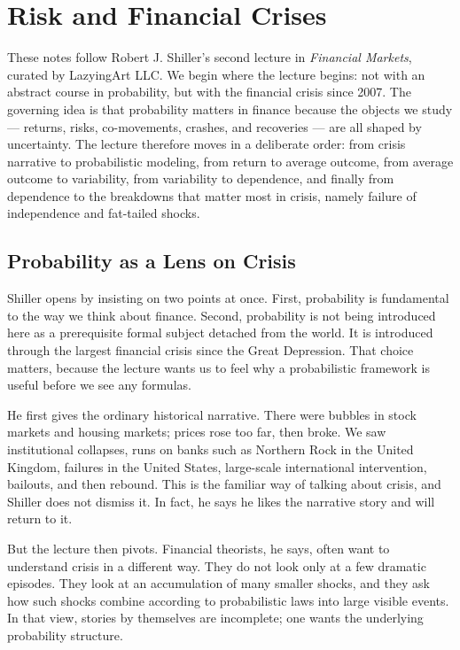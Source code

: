 \chapter{Risk and Financial Crises}

These notes follow Robert J. Shiller's second lecture in \textit{Financial Markets}, curated by LazyingArt LLC. We begin where the lecture begins: not with an abstract course in probability, but with the financial crisis since 2007. The governing idea is that probability matters in finance because the objects we study --- returns, risks, co-movements, crashes, and recoveries --- are all shaped by uncertainty. The lecture therefore moves in a deliberate order: from crisis narrative to probabilistic modeling, from return to average outcome, from average outcome to variability, from variability to dependence, and finally from dependence to the breakdowns that matter most in crisis, namely failure of independence and fat-tailed shocks.

\section{Probability as a Lens on Crisis}

Shiller opens by insisting on two points at once. First, probability is fundamental to the way we think about finance. Second, probability is not being introduced here as a prerequisite formal subject detached from the world. It is introduced through the largest financial crisis since the Great Depression. That choice matters, because the lecture wants us to feel why a probabilistic framework is useful before we see any formulas.

He first gives the ordinary historical narrative. There were bubbles in stock markets and housing markets; prices rose too far, then broke. We saw institutional collapses, runs on banks such as Northern Rock in the United Kingdom, failures in the United States, large-scale international intervention, bailouts, and then rebound. This is the familiar way of talking about crisis, and Shiller does not dismiss it. In fact, he says he likes the narrative story and will return to it.

But the lecture then pivots. Financial theorists, he says, often want to understand crisis in a different way. They do not look only at a few dramatic episodes. They look at an accumulation of many smaller shocks, and they ask how such shocks combine according to probabilistic laws into large visible events. In that view, stories by themselves are incomplete; one wants the underlying probability structure.

